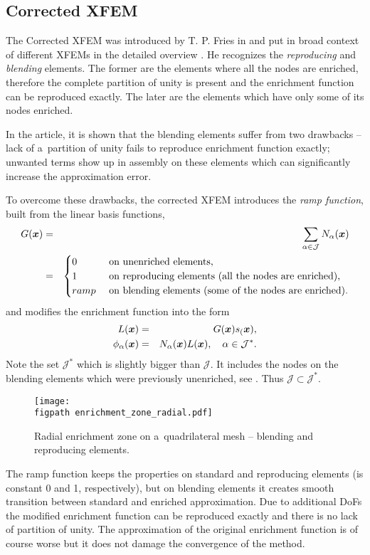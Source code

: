 \subsection{Corrected XFEM} \label{sec:corrected_xfem}
The Corrected XFEM was introduced by T. P. Fries in \cite{fries_corrected_2008} and put in broad context of different XFEMs in the detailed overview \cite{fries_xfem_overview_2010}.
He recognizes the \emph{reproducing} and \emph{blending} elements.
The former are the elements where all the nodes are enriched, therefore the complete partition of unity is present
and the enrichment function can be reproduced exactly. The later are the elements which have only some of its nodes enriched.

In the article, it is shown that the blending elements suffer from two drawbacks -- lack of a~partition of unity fails to reproduce enrichment function exactly;
unwanted terms show up in assembly on these elements which can significantly increase the approximation error.
 
To overcome these drawbacks, the corrected XFEM introduces the \emph{ramp function}, built from the linear basis functions,
\begin{eqnarray} \label{eqn:ramp_function}
  G(\mathbf{\boldsymbol{x}}) &=& \sum_{\alpha\in\mathcal{J}} N_\alpha(\mathbf{\boldsymbol{x}})    \\
  &=& 
  \begin{cases}
    0 & \textrm{ on unenriched elements,}    \\
    1 & \textrm{ on reproducing elements (all the nodes are enriched),}    \\
    ramp & \textrm{ on blending elements (some of the nodes are enriched).}    \\
  \end{cases} \nonumber
\end{eqnarray}
and modifies the enrichment function into the form
\begin{eqnarray} \label{eqn:xfem_ramp}
    L(\mathbf{\boldsymbol{x}}) &=& G(\mathbf{\boldsymbol{x}}) s_(\mathbf{\boldsymbol{x}}),\\
    \phi_{\alpha}(\mathbf{\boldsymbol{x}}) &=& N_\alpha(\mathbf{\boldsymbol{x}})L(\mathbf{\boldsymbol{x}}), \quad \alpha\in\mathcal{J}^*.
\end{eqnarray}
Note the set $\mathcal{J}^*$ which is slightly bigger than $\mathcal{J}$. It includes the nodes on the blending
elements which were previously unenriched, see . Thus $\mathcal{J}\subset\mathcal{J}^*$.
%
\begin{figure}[!htb]
  \centering    
    \texttt{[image: \\figpath enrichment\_zone\_radial.pdf]}
  \caption[Radial enrichment zone]{Radial enrichment zone on a~quadrilateral mesh -- blending and reproducing elements.}
  \label{fig:enrichment_zone_radial}
\end{figure}
%
The ramp function keeps the properties on standard and reproducing elements (is constant 0 and 1, respectively),
but on blending elements it creates smooth transition between standard and enriched approximation. Due to
additional DoFs the modified enrichment function can be reproduced exactly and there is no lack of partition of unity.
The approximation of the original enrichment function is of course worse but it does not damage the convergence of the method.


